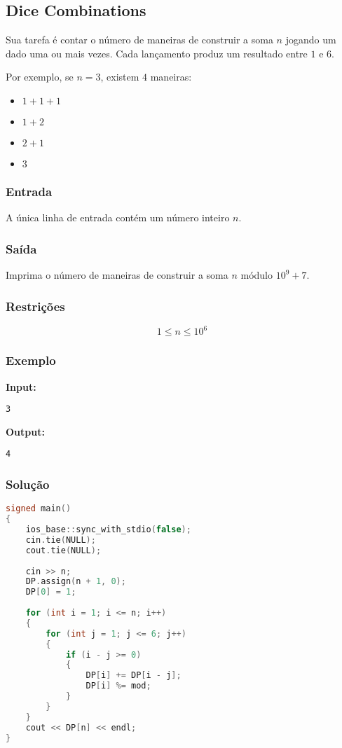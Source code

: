 \subsection{Dice Combinations}
Sua tarefa é contar o número de maneiras de construir a soma \( n \) jogando um dado uma ou mais vezes. Cada lançamento produz um resultado entre \( 1 \) e \( 6 \).

Por exemplo, se \( n = 3 \), existem \( 4 \) maneiras:
\begin{itemize}
    \item \(1+1+1\)
    \item \(1+2\)
    \item \(2+1\)
    \item \(3\)
\end{itemize}

\subsubsection*{Entrada}
A única linha de entrada contém um número inteiro \( n \).

\subsubsection*{Saída}
Imprima o número de maneiras de construir a soma \( n \) módulo \( 10^9+7 \).

\subsubsection*{Restrições}
\[
1 \le n \le 10^6
\]

\subsubsection*{Exemplo}

\textbf{Input:}
\begin{verbatim}
3
\end{verbatim}

\textbf{Output:}
\begin{verbatim}
4
\end{verbatim}

\subsubsection*{Solução}
\begin{lstlisting}[language=C++]
signed main()
{
    ios_base::sync_with_stdio(false);
    cin.tie(NULL);
    cout.tie(NULL);
    
    cin >> n;
    DP.assign(n + 1, 0);
    DP[0] = 1;
    
    for (int i = 1; i <= n; i++)
    {
        for (int j = 1; j <= 6; j++)
        {
            if (i - j >= 0)
            {
                DP[i] += DP[i - j];
                DP[i] %= mod;
            }
        }
    }
    cout << DP[n] << endl;
}
\end{lstlisting}

